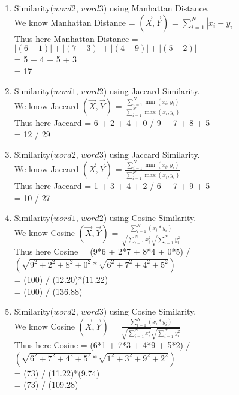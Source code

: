 \documentclass[11pt]{article}
\begin{document}
\begin{enumerate}
\begin{enumerate}
\item Similarity($word2$, $word3$) using Manhattan Distance.  \\ 

We know Manhattan Distance = $(\vec {X}, \vec {Y})$ = $\sum ^{N}_{i=1} |x_{i} - y_{i} |$\\
Thus here Manhattan Distance = $|(6-1)| + |(7-3)| + |(4-9)| + |(5-2)|$\\
= 5 + 4 + 5 + 3\\
= 17\\


\item Similarity($word1$, $word2$) using Jaccard Similarity.  \\

We know Jaccard $(\vec {X}, \vec {Y})$ = $\frac { \sum^{N}_{i=1} \min (x_{i},y_{i})} { \sum^{N}_{i=1} \max (x_{i},y_{i})}$\\
Thus here Jaccard = 6 + 2 + 4 + 0 / 9 + 7 + 8 + 5\\
= 12 / 29\\

\item Similarity($word2$, $word3$) using Jaccard Similarity.  \\

We know Jaccard $(\vec {X}, \vec {Y})$ = $\frac { \sum^{N}_{i=1} \min (x_{i},y_{i})} { \sum^{N}_{i=1} \max (x_{i},y_{i})}$\\
Thus here Jaccard = 1 + 3 + 4 + 2 / 6 + 7 + 9 + 5\\
= 10 / 27\\

\item Similarity($word1$, $word2$) using Cosine Similarity.  \\ 

We know Cosine $(\vec {X}, \vec {Y})$ = $\frac { \sum^{N}_{i=1} (x_{i}*y_{i})} {\sqrt {\sum^{N}_{i=1} x_{i}^{2}} \sqrt {\sum^{N}_{i=1} y_{i}^{2}}}$\\
Thus here Cosine = (9*6 + 2*7 + 8*4 + 0*5) / $(\sqrt {9^{2} + 2^{2} + 8^{2} + 0^{2}} * \sqrt {6^{2} + 7^{2} + 4^{2} + 5^{2}})$\\
= (100) / (12.20)*(11.22)\\
= (100) / (136.88)\\


\item Similarity($word2$, $word3$) using Cosine Similarity.  \\ 

We know Cosine $(\vec {X}, \vec {Y})$ = $\frac { \sum^{N}_{i=1} (x_{i}*y_{i})} {\sqrt {\sum^{N}_{i=1} x_{i}^{2}} \sqrt {\sum^{N}_{i=1} y_{i}^{2}}}$\\
Thus here Cosine = (6*1 + 7*3 + 4*9 + 5*2) / $(\sqrt {6^{2} + 7^{2} + 4^{2} + 5^{2}} * \sqrt {1^{2} + 3^{2} + 9^{2} +2^{2}})$\\
= (73) / (11.22)*(9.74)\\
= (73) / (109.28)\\



\end{enumerate}
\end{enumerate}
\end{document}

